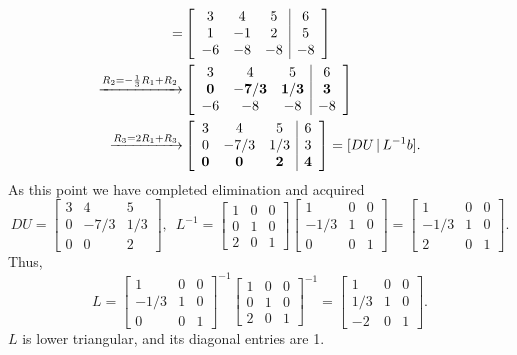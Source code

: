 \documentclass[10pt]{article}
\begin{document}
\begin{align*} 
[A \, | b]  = & \left[ \begin{array}{ccc|ccc|c}
3 & 4 & 5 &  6 \\
1 & -1 & 2 &  5 \\ 
-6 & -8 & -8 &  -8
\end{array}\right] \\
\xrightarrow{R_2 = -\frac{1}{3} R_1 + R_2} 
& \left[ \begin{array}{ccc|ccc|c}
3 & 4 & 5  & 6 \\
{\bf 0} & {\bf -7/3} & {\bf 1/3} &  {\bf 3} \\ 
-6 & -8 & -8 &  -8
\end{array}\right] \\
\xrightarrow{R_3 = 2 R_1 + R_3} 
  & \left[ \begin{array}{ccc|ccc|c}
3 & 4 & 5 &  6 \\
0 & -7/3 & 1/3 & 3\\ 
{\bf 0} & {\bf 0} & {\bf 2} & {\bf 4}
\end{array}\right] = [DU \, | \, L^{-1} b]. 
\end{align*}
As this point we have completed elimination and acquired 
\[ DU = \left[ \begin{array}{ccc}
3 & 4 & 5  \\
0 & -7/3 & 1/3 \\ 
0 & 0 & 2
\end{array}\right], \,\,\, 
L^{-1} = 
\left[ \begin{array}{ccc}
1 & 0 & 0  \\
0 & 1 & 0 \\ 
2 & 0 & 1
\end{array}\right]\left[ \begin{array}{ccc}
1 & 0 & 0  \\
-1/3 & 1 & 0 \\ 
0 & 0 & 1
\end{array}\right]
 = \left[ \begin{array}{ccc}
1 & 0 & 0  \\
-1/3 & 1 & 0 \\ 
2 & 0 & 1
\end{array}\right]. \]
Thus, 
\[ L = 
\left[ \begin{array}{ccc}
1 & 0 & 0  \\
-1/3 & 1 & 0 \\ 
0 & 0 & 1
\end{array}\right]^{-1} 
\left[ \begin{array}{ccc}
1 & 0 & 0  \\
0 & 1 & 0 \\ 
2 & 0 & 1
\end{array}\right]^{-1}
 = \left[ \begin{array}{ccc}
1 & 0 & 0  \\
1/3 & 1 & 0 \\ 
-2 & 0 & 1
\end{array}\right]. \]
$L$ is lower triangular, and its diagonal entries are 1.
\end{document}
